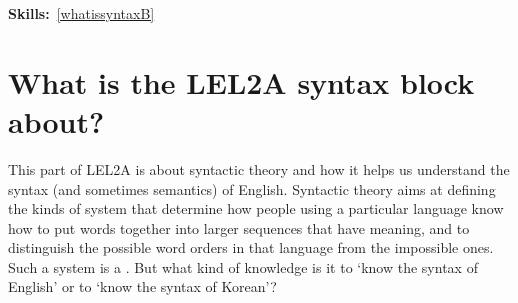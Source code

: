 \documentclass{article}
\begin{document}
\maketitle
\subtitle{Topic 1 Course Notes: What is Syntax?}
\hfill{}\textbf{Skills:}~\ref{whatissyntaxB}%

\section{What is the LEL2A syntax block about?}

This part of LEL2A is about syntactic theory and how it helps us understand the syntax (and sometimes semantics) of English.
Syntactic theory aims at defining the kinds of system that determine how people using a particular language know how to put words together into larger sequences that have meaning, and to distinguish the possible word orders in that language from the impossible ones. 
Such a system is a .
But what kind of knowledge is it to `know the syntax of English' or to `know the syntax of Korean'? 


\end{document}
